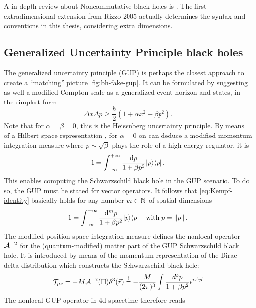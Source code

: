 \documentclass[12pt,a4paper]{report}
\numberwithin{equation}{chapter}
\begin{document}
\begin{appendices}
A in-depth review about Noncommutative black holes is \cite{N2008NCBH}. The first extradimensional extension from Rizzo 2005 \cite{Rizzo} actually determines the syntax and conventions in this thesis, considering extra dimensions.

\subsection{Generalized Uncertainty Principle black holes}\label{sec:apx-gup}
The generalized uncertainty principle (GUP) is perhaps the closest approach to create a ``matching'' picture \ref{fig:bh-fake-gup}. It can be formulated by suggesting as well a modified Compton scale as a generalized event horizon \cite{Carr2011,Carr2014,AuriliaSpallucci2013} and states, in the simplest form
\begin{equation}
\Delta x \Delta p \geq \frac \hbar 2 \left( 1 + \alpha x^2 + \beta p^2\right).
\end{equation}
Note that for $\alpha=\beta=0$, this is the Heisenberg uncertainty principle. By means of a Hilbert space representation \cite{Kempf1994}, for $\alpha=0$ on can deduce a modified momentum integration measure where $p \sim \sqrt{\beta}$ plays the role of a high energy regulator, it is \cite{Kempf1994}
\begin{equation}\label{eq:Kempf-identity}
1 = \int_{-\infty}^{+\infty} \frac{\mathrm{d} p}{1 + \beta p^2} |p\rangle\langle p | \,.
\end{equation}
This enables computing the Schwarzschild black hole in the GUP scenario. To do so, the GUP must be stated for vector operators. It follows that \eqref{eq:Kempf-identity} basically holds for any number $m\in\mathbb{N}$ of spatial dimensions \cite{Kempf1994,Isi1}
\begin{equation}
1 = \int_{-\infty}^{+\infty} \frac{\mathrm{d}^{m} p}{1 + \beta p^2}
|p\rangle\langle p|
\quad
\text{with}~p=\|p\|
\,.
\end{equation}
The modified position space integration measure defines the nonlocal operator ${\cal A}^{-2}$ for the (quantum-modified) matter part of the GUP Schwarzschild black hole. It is introduced by means of the momentum representation of the Dirac delta distribution which constructs the Schwarzschild black hole:
\begin{equation}\label{eq:GUP-T00-def}
{\cal T}_{\mu\nu} = -M {\cal A}^{-2}(\square) \delta^3(\vec r)
\stackrel{!}{=} -
\frac{M}{(2\pi)^3}
\int
\frac{d^3 p}{1 + \beta p^2} e^{i \vec x \cdot \vec p}
\end{equation}
The nonlocal GUP operator in 4d spacetime therefore reads

\end{appendices}
\end{document}
